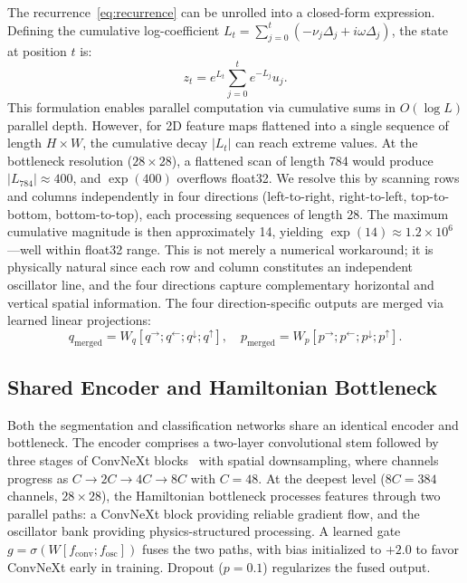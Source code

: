 \documentclass[11pt]{article}
\begin{document}
The recurrence~\eqref{eq:recurrence} can be unrolled into a closed-form expression. Defining the cumulative log-coefficient $L_t = \sum_{j=0}^{t}(-\nu_j\Delta_j + i\omega\Delta_j)$, the state at position $t$ is:
\begin{equation}
    z_t = e^{L_t} \sum_{j=0}^{t} e^{-L_j} u_j.
    \label{eq:parallel_scan}
\end{equation}
This formulation enables parallel computation via cumulative sums in $O(\log L)$ parallel depth. However, for 2D feature maps flattened into a single sequence of length $H \times W$, the cumulative decay $|L_t|$ can reach extreme values. At the bottleneck resolution ($28 \times 28$), a flattened scan of length 784 would produce $|L_{784}| \approx 400$, and $\exp(400)$ overflows float32. We resolve this by scanning rows and columns independently in four directions (left-to-right, right-to-left, top-to-bottom, bottom-to-top), each processing sequences of length 28. The maximum cumulative magnitude is then approximately 14, yielding $\exp(14) \approx 1.2 \times 10^6$---well within float32 range. This is not merely a numerical workaround; it is physically natural since each row and column constitutes an independent oscillator line, and the four directions capture complementary horizontal and vertical spatial information. The four direction-specific outputs are merged via learned linear projections:
\begin{equation}
    q_\text{merged} = W_q [q^{\rightarrow}; q^{\leftarrow}; q^{\downarrow}; q^{\uparrow}], \quad p_\text{merged} = W_p [p^{\rightarrow}; p^{\leftarrow}; p^{\downarrow}; p^{\uparrow}].
    \label{eq:direction_merge}
\end{equation}

\subsection{Shared Encoder and Hamiltonian Bottleneck}

Both the segmentation and classification networks share an identical encoder and bottleneck. The encoder comprises a two-layer convolutional stem followed by three stages of ConvNeXt blocks~\cite{liu2022convnext} with spatial downsampling, where channels progress as $C \to 2C \to 4C \to 8C$ with $C = 48$. At the deepest level ($8C = 384$ channels, $28 \times 28$), the Hamiltonian bottleneck processes features through two parallel paths: a ConvNeXt block providing reliable gradient flow, and the oscillator bank providing physics-structured processing. A learned gate $g = \sigma(W[f_\text{conv}; f_\text{osc}])$ fuses the two paths, with bias initialized to $+2.0$ to favor ConvNeXt early in training. Dropout ($p{=}0.1$) regularizes the fused output.
\end{document}
